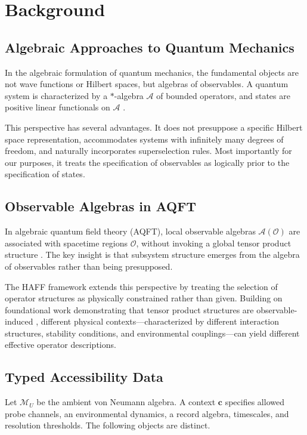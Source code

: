\documentclass[12pt,a4paper]{article}
\begin{document}
\section{Background}
\label{sec:background}

\subsection{Algebraic Approaches to Quantum Mechanics}

In the algebraic formulation of quantum mechanics, the fundamental objects are not wave functions or Hilbert spaces, but algebras of observables. A quantum system is characterized by a $*$-algebra $\mathcal{A}$ of bounded operators, and states are positive linear functionals on $\mathcal{A}$ \cite{Haag1996,Araki1999}.

This perspective has several advantages. It does not presuppose a specific Hilbert space representation, accommodates systems with infinitely many degrees of freedom, and naturally incorporates superselection rules. Most importantly for our purposes, it treats the specification of observables as logically prior to the specification of states.

\subsection{Observable Algebras in AQFT}

In algebraic quantum field theory (AQFT), local observable algebras $\mathcal{A}(\mathcal{O})$ are associated with spacetime regions $\mathcal{O}$, without invoking a global tensor product structure \cite{Haag1996}. The key insight is that subsystem structure emerges from the algebra of observables rather than being presupposed.

The HAFF framework extends this perspective by treating the selection of operator structures as physically constrained rather than given. Building on foundational work demonstrating that tensor product structures are observable-induced \cite{Zanardi2001,Zanardi2004}, different physical contexts---characterized by different interaction structures, stability conditions, and environmental couplings---can yield different effective operator descriptions.

\subsection{Typed Accessibility Data}

Let $\mathcal M_U$ be the ambient von Neumann algebra.  A context $\mathbf c$ specifies allowed probe channels, an environmental dynamics, a record algebra, timescales, and resolution thresholds.  The following objects are distinct.
\end{document}
